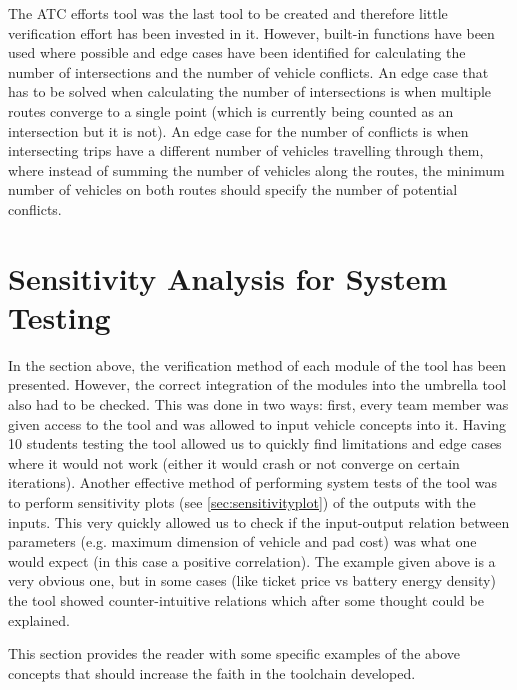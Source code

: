 The ATC efforts tool was the last tool to be created and therefore little verification effort has been invested in it. However, built-in functions have been used where possible and edge cases have been identified for calculating the number of intersections and the number of vehicle conflicts. An edge case that has to be solved when calculating the number of intersections is when multiple routes converge to a single point (which is currently being counted as an intersection but it is not). An edge case for the number of conflicts is when intersecting trips have a different number of vehicles travelling through them, where instead of summing the number of vehicles along the routes, the minimum number of vehicles on both routes should specify the number of potential conflicts.
















\section{Sensitivity Analysis for System Testing} \label{sec:sensiForTesting}

In the section above, the verification method of each module of the tool has been presented. However, the correct integration of the modules into the umbrella tool also had to be checked. This was done in two ways: first, every team member was given access to the tool and was allowed to input vehicle concepts into it. Having 10 students testing the tool allowed us to quickly find limitations and edge cases where it would not work (either it would crash or not converge on certain iterations). Another effective method of performing system tests of the tool was to perform sensitivity plots (see \autoref{sec:sensitivityplot}) of the outputs with the inputs. This very quickly allowed us to check if the input-output relation between parameters (e.g. maximum dimension of vehicle and pad cost) was what one would expect (in this case a positive correlation). The example given above is a very obvious one, but in some cases (like ticket price vs battery energy density) the tool showed counter-intuitive relations which after some thought could be explained.

This section provides the reader with some specific examples of the above concepts that should increase the faith in the toolchain developed.


